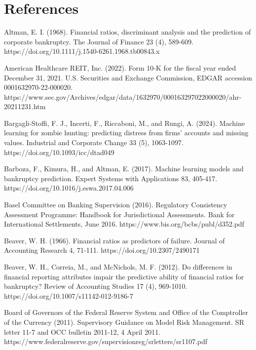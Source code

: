 \documentclass[10pt,a4paper,twocolumn]{article}
\begin{document}
\section*{References}
\begingroup\small
\noindent Altman, E. I. (1968). Financial ratios, discriminant analysis and the prediction of corporate bankruptcy. The Journal of Finance 23 (4), 589-609. https://doi.org/10.1111/j.1540-6261.1968.tb00843.x\par\vspace{2pt}
\noindent American Healthcare REIT, Inc. (2022). Form 10-K for the fiscal year ended December 31, 2021. U.S. Securities and Exchange Commission, EDGAR accession 0001632970-22-000020. https://www.sec.gov/Archives/edgar/data/1632970/000163297022000020/ahr-20211231.htm\par\vspace{2pt}
\noindent Bargagli-Stoffi, F. J., Incerti, F., Riccaboni, M., and Rungi, A. (2024). Machine learning for zombie hunting: predicting distress from firms’ accounts and missing values. Industrial and Corporate Change 33 (5), 1063-1097. https://doi.org/10.1093/icc/dtad049\par\vspace{2pt}
\noindent Barboza, F., Kimura, H., and Altman, E. (2017). Machine learning models and bankruptcy prediction. Expert Systems with Applications 83, 405-417. https://doi.org/10.1016/j.eswa.2017.04.006\par\vspace{2pt}
\noindent Basel Committee on Banking Supervision (2016). Regulatory Consistency Assessment Programme: Handbook for Jurisdictional Assessments. Bank for International Settlements, June 2016. https://www.bis.org/bcbs/publ/d352.pdf\par\vspace{2pt}
\noindent Beaver, W. H. (1966). Financial ratios as predictors of failure. Journal of Accounting Research 4, 71-111. https://doi.org/10.2307/2490171\par\vspace{2pt}
\noindent Beaver, W. H., Correia, M., and McNichols, M. F. (2012). Do differences in financial reporting attributes impair the predictive ability of financial ratios for bankruptcy? Review of Accounting Studies 17 (4), 969-1010. https://doi.org/10.1007/s11142-012-9186-7\par\vspace{2pt}
\noindent Board of Governors of the Federal Reserve System and Office of the Comptroller of the Currency (2011). Supervisory Guidance on Model Risk Management. SR letter 11-7 and OCC bulletin 2011-12, 4 April 2011. https://www.federalreserve.gov/supervisionreg/srletters/sr1107.pdf\par\vspace{2pt}
\end{document}
